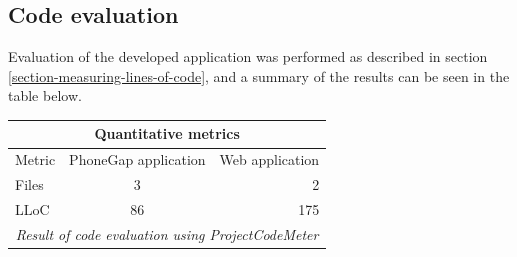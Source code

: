 \subsection{Code evaluation}\label{sec:phonegapeval}
Evaluation of the developed application was performed as described in section \ref{section-measuring-lines-of-code}, and a summary of the results  can be seen in the table below.

\begin{tabular}{ | l | c | r | }
    \hline
    \multicolumn{3}{|c|}{Quantitative metrics} \\
    \hline
	Metric & PhoneGap application &  Web application \\
	\hline
	Files & 3 & 2\\
	LLoC & 86 & 175\\	
	\hline
	\multicolumn{3}{c}{\emph{Result of code evaluation using ProjectCodeMeter}}
\end{tabular}